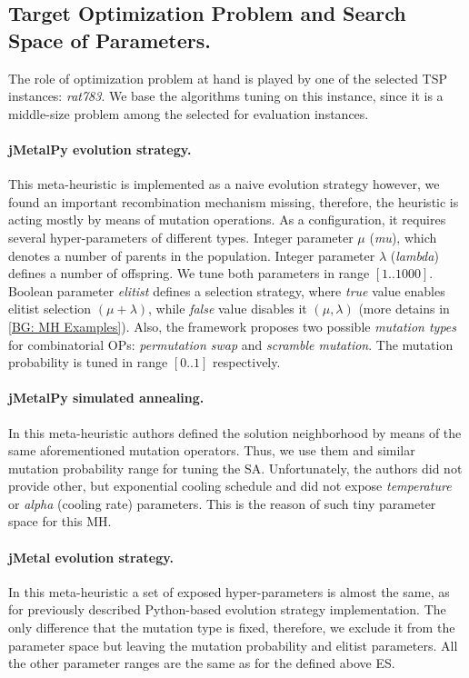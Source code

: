 \subsection{Target Optimization Problem and Search Space of Parameters.} 
The role of optimization problem at hand is played by one of the selected TSP instances: \emph{rat783}. We base the algorithms tuning on this instance, since it is a middle-size problem among the selected for evaluation instances.

\paragraph{jMetalPy evolution strategy.} This meta-heuristic is implemented as a naive evolution strategy however, we found an important recombination mechanism missing, therefore, the heuristic is acting mostly by means of mutation operations. As a configuration, it requires several hyper-parameters of different types. Integer parameter $\mu$ (\emph{mu}), which denotes a number of parents in the population. Integer parameter $\lambda$ (\emph{lambda}) defines a number of offspring. We tune both parameters in range $[1..1000]$. Boolean parameter \emph{elitist} defines a selection strategy, where \emph{true} value enables elitist selection $(\mu+\lambda)$, while \emph{false} value disables it $(\mu,\lambda)$ (more detains in \cref{BG: MH Examples}). Also, the framework proposes two possible \emph{mutation types} for combinatorial OPs: \emph{permutation swap} and \emph{scramble mutation}. The mutation probability is tuned in range $[0..1]$ respectively.

\paragraph{jMetalPy simulated annealing.} In this meta-heuristic authors defined the solution neighborhood by means of the same aforementioned mutation operators. Thus, we use them and similar mutation probability range for tuning the SA. Unfortunately, the authors did not provide other, but exponential cooling schedule and did not expose \emph{temperature} or \emph{alpha} (cooling rate) parameters. This is the reason of such tiny parameter space for this MH.

\paragraph{jMetal evolution strategy.} In this meta-heuristic a set of exposed hyper-parameters is almost the same, as for previously described Python-based evolution strategy implementation. The only difference that the mutation type is fixed, therefore, we exclude it from the parameter space but leaving the mutation probability and elitist parameters. All the other parameter ranges are the same as for the defined above ES.


